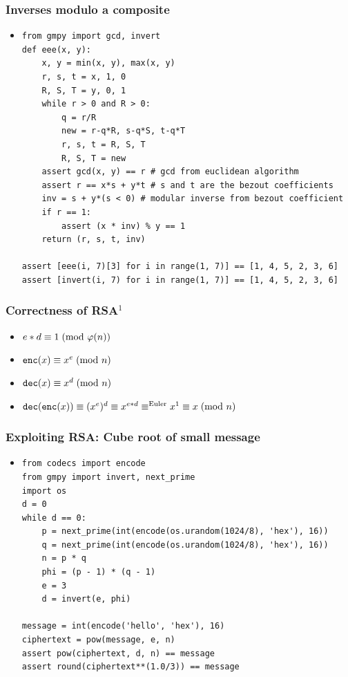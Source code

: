 \documentclass[aspectratio=169]{beamer}
\begin{document}
\begin{frame}[fragile]
\frametitle{Inverses modulo a composite}
\begin{itemize}
\item \begin{Verbatim}[fontsize=\scriptsize]
from gmpy import gcd, invert
def eee(x, y):
    x, y = min(x, y), max(x, y)
    r, s, t = x, 1, 0
    R, S, T = y, 0, 1
    while r > 0 and R > 0:
        q = r/R
        new = r-q*R, s-q*S, t-q*T
        r, s, t = R, S, T
        R, S, T = new
    assert gcd(x, y) == r # gcd from euclidean algorithm
    assert r == x*s + y*t # s and t are the bezout coefficients
    inv = s + y*(s < 0) # modular inverse from bezout coefficient
    if r == 1:
        assert (x * inv) % y == 1
    return (r, s, t, inv)

assert [eee(i, 7)[3] for i in range(1, 7)] == [1, 4, 5, 2, 3, 6]
assert [invert(i, 7) for i in range(1, 7)] == [1, 4, 5, 2, 3, 6]
\end{Verbatim}
\end{itemize}
\end{frame}

\begin{frame}[fragile]
\frametitle{Correctness of RSA$^{1}$}
\begin{itemize}
\item $e * d \equiv 1\hspace{1mm}(\text{mod } \varphi(n))$
\item $\verb|enc|(x) \equiv x^e\hspace{1mm}(\text{mod }n)$
\item $\verb|dec|(x) \equiv x^d\hspace{1mm}(\text{mod }n)$
\item $\verb|dec|(\verb|enc|(x)) \equiv (x^e)^d \equiv x^{e*d} \equiv^{\text{Euler}} x^1 \equiv x \hspace{1mm}(\text{mod }n)$
\end{itemize}
\end{frame}

\begin{frame}[fragile]
\frametitle{Exploiting RSA: Cube root of small message}
\begin{itemize}
\item
\begin{Verbatim}[fontsize=\scriptsize]
from codecs import encode
from gmpy import invert, next_prime
import os
d = 0
while d == 0:
    p = next_prime(int(encode(os.urandom(1024/8), 'hex'), 16))
    q = next_prime(int(encode(os.urandom(1024/8), 'hex'), 16))
    n = p * q
    phi = (p - 1) * (q - 1)
    e = 3
    d = invert(e, phi)

message = int(encode('hello', 'hex'), 16)
ciphertext = pow(message, e, n)
assert pow(ciphertext, d, n) == message
assert round(ciphertext**(1.0/3)) == message
\end{Verbatim}
\end{itemize}
\end{frame}
\end{document}
